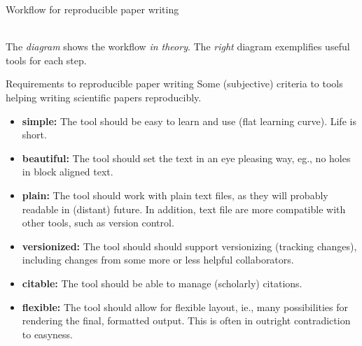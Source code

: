 \documentclass[final,hyperref={pdfpagelabels=false}]{beamer}
\begin{document}
\begin{frame}{}
\begin{columns}[t]
\begin{column}{.48\linewidth}
\begin{block}{Workflow for reproducible paper writing}
\begin{minipage}[t]{0.50\textwidth}
     \end{minipage}	
     \\
    The \emph{diagram} shows the workflow \emph{in theory}. The \emph{right} diagram exemplifies useful tools for each step.      
    \end{block}





        \begin{block}{Requirements to reproducible paper writing}
        Some (subjective) criteria to tools helping writing scientific papers reproducibly.
          \begin{itemize}
          \item \textbf{simple:} The tool should be easy to learn and use (flat learning curve). Life is short.
          \item \textbf{beautiful:} The tool should set the text in an eye pleasing way, eg., no holes in block aligned text.
	   \item \textbf{plain:} The tool should work with plain text files, as they will probably readable in (distant) future. In addition, text file are more compatible with other tools, such as version control. 
         \item \textbf{versionized:} The tool should should support versionizing (tracking changes), including changes from some more or less helpful collaborators.
         \item \textbf{citable:} The tool should be able to manage (scholarly) citations.
         \item \textbf{flexible:} The tool should allow for flexible layout, ie., many possibilities for rendering the final, formatted output. This is often in outright contradiction to easyness.
	

\end{itemize}
\end{block}
\end{column}
\end{columns}
\end{frame}
\end{document}
